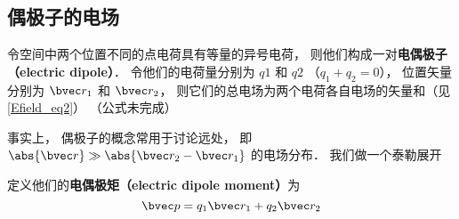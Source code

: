 


\subsection{偶极子的电场}

令空间中两个位置不同的点电荷具有等量的异号电荷， 则他们构成一对\textbf{电偶极子（electric dipole）}． 令他们的电荷量分别为 $q1$ 和 $q2$ （$q_1 + q_2 = 0$）， 位置矢量分别为 $\bvec r_1$ 和 $\bvec r_2$， 则它们的总电场为两个电荷各自电场的矢量和（见\autoref{Efield_eq2}）
（公式未完成）

事实上， 偶极子的概念常用于讨论远处， 即 $\abs{\bvec r} \gg \abs{\bvec r_2 - \bvec r_1}$ 的电场分布． 我们做一个泰勒展开

定义他们的\textbf{电偶极矩（electric dipole moment）}为
\begin{equation}
\bvec p = q_1 \bvec r_1 + q_2 \bvec r_2
\end{equation}
